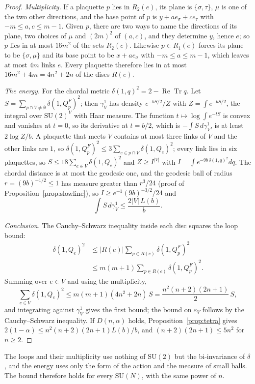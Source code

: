 \documentclass[aps,prd,twocolumn,superscriptaddress,nofootinbib,longbibliography,floatfix,amsmath,amssymb,10pt]{revtex4-2}
\theoremstyle{definition}
\theoremstyle{remark}
\newcommand{\SU}{\mathrm{SU}}
\newcommand{\ReTr}{\operatorname{Re}\operatorname{Tr}}
\begin{document}
\begin{proof}
\emph{Multiplicity.} If a plaquette $p$ lies in $R_2(e)$, its plane is
$\{\sigma,\tau\}$, $\mu$ is one of the two other directions, and the base point
of $p$ is $y+ae_\sigma+ce_\tau$ with $-m\le a,c\le m-1$. Given $p$, there are
two ways to name the directions of its plane, two choices of $\mu$ and $(2m)^2$
of $(a,c)$, and they determine $y$, hence $e$; so $p$ lies in at most $16m^2$
of the sets $R_2(e)$. Likewise $p\in R_1(e)$ forces its plane to be
$\{\sigma,\mu\}$ and its base point to be $x+ae_\sigma$ with $-m\le a\le m-1$,
which leaves at most $4m$ links $e$. Every plaquette therefore lies in at most
$16m^2+4m=4n^2+2n$ of the discs $R(e)$.

\emph{The energy.} For the chordal metric $\delta(1,q)^2=2-\ReTr q$. Let
$S=\sum_{p\cap V\ne\emptyset}\delta(1,Q^F_p)^2$; then $\gamma^1_V$ has density
$e^{-bS/2}/Z$ with $Z=\int e^{-bS/2}$, the integral over $\SU(2)^V$ with Haar
measure. The function $t\mapsto\log\int e^{-tS}$ is convex and vanishes at
$t=0$, so its derivative at $t=b/2$, which is $-\int S\,d\gamma^1_V$, is at least
$2\log Z/b$. A plaquette that meets $V$ contains at most three links of $V$ and
the other links are $1$, so $\delta(1,Q^F_p)^2\le3\sum_{e\in p\cap V}
\delta(1,Q_e)^2$; every link lies in six plaquettes, so
$S\le18\sum_{e\in V}\delta(1,Q_e)^2$ and $Z\ge I^{|V|}$ with
$I=\int e^{-9b\,\delta(1,q)^2}dq$. The chordal distance is at most the geodesic
one, and the geodesic ball of radius $r=(9b)^{-1/2}\le1$ has measure greater
than $r^3/24$ (proof of Proposition~\ref{prop:slowline}), so $I\ge
e^{-1}(9b)^{-3/2}/24$ and
\[
\int S\,d\gamma^1_V\le\frac{2|V|\,L(b)}b .
\]

\emph{Conclusion.} The Cauchy--Schwarz inequality inside each disc squares
the loop bound:
\[
\begin{aligned}
\delta(1,Q_e)^2&\le|R(e)|\sum_{p\in R(e)}\delta(1,Q^F_p)^2\\
&\le m(m+1)\sum_{p\in R(e)}\delta(1,Q^F_p)^2 .
\end{aligned}
\]
Summing over
$e\in V$ and using the multiplicity,
\[
\sum_{e\in V}\delta(1,Q_e)^2\le m(m+1)(4n^2+2n)\,S
=\frac{n^2(n+2)(2n+1)}2\,S ,
\]
and integrating against $\gamma^1_V$ gives the first bound; the bound on
$\varepsilon_V$ follows by the Cauchy--Schwarz inequality. If $D(n,\alpha)$
holds, Proposition~\ref{prop:tetra} gives $2(1-\alpha)\le
n^2(n+2)(2n+1)L(b)/b$, and $(n+2)(2n+1)\le5n^2$ for $n\ge2$.
\end{proof}

The loops and their multiplicity use nothing of $\SU(2)$ but the
bi-invariance of $\delta$, and the energy uses only the form of the action and
the measure of small balls. The bound therefore holds for every $\SU(N)$,
with the same power of $n$.
\end{document}
